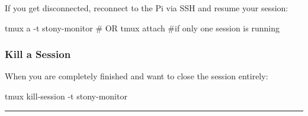 \documentclass[
  letterpaper,
]{scrbook}
\newenvironment{Shaded}{\begin{snugshade}}{\end{snugshade}}
\newcommand{\AttributeTok}[1]{\textcolor[rgb]{0.40,0.45,0.13}{#1}}
\newcommand{\CommentTok}[1]{\textcolor[rgb]{0.37,0.37,0.37}{#1}}
\newcommand{\ExtensionTok}[1]{\textcolor[rgb]{0.00,0.23,0.31}{#1}}
\newcommand{\NormalTok}[1]{\textcolor[rgb]{0.00,0.23,0.31}{#1}}
\begin{document}
If you get disconnected, reconnect to the Pi via SSH and resume your
session:

\begin{Shaded}
\begin{Highlighting}[]
\ExtensionTok{tmux}\NormalTok{ a }\AttributeTok{{-}t}\NormalTok{ stony{-}monitor}
\CommentTok{\# OR}
\ExtensionTok{tmux}\NormalTok{ attach }\CommentTok{\#if only one session is running}
\end{Highlighting}
\end{Shaded}

\subsubsection{Kill a Session}\label{kill-a-session}

When you are completely finished and want to close the session entirely:

\begin{Shaded}
\begin{Highlighting}[]
\ExtensionTok{tmux}\NormalTok{ kill{-}session }\AttributeTok{{-}t}\NormalTok{ stony{-}monitor}
\end{Highlighting}
\end{Shaded}

\begin{center}\rule{0.5\linewidth}{0.5pt}\end{center}
\end{document}
